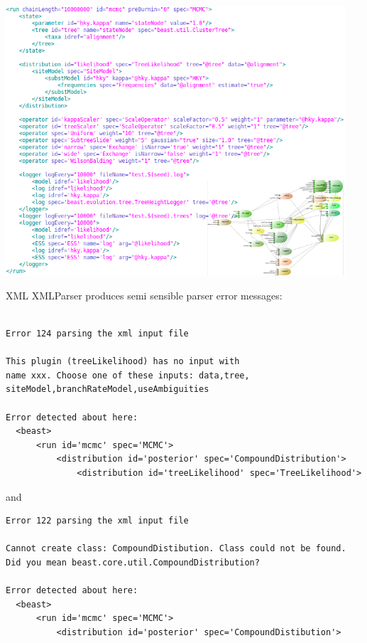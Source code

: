 \documentclass{beamer}
\theoremstyle{definition}
\begin{document}
\begin{frame}
\includegraphics[width=0.95\textwidth]{xml4.png}
\end{frame}


\begin{frame}[containsverbatim]{XML}
XMLParser produces semi sensible parser error messages:

{\tiny
\begin{verbatim}

Error 124 parsing the xml input file

This plugin (treeLikelihood) has no input with 
name xxx. Choose one of these inputs: data,tree,
siteModel,branchRateModel,useAmbiguities

Error detected about here:
  <beast>
      <run id='mcmc' spec='MCMC'>
          <distribution id='posterior' spec='CompoundDistribution'>
              <distribution id='treeLikelihood' spec='TreeLikelihood'>
\end{verbatim}
}

and

{\tiny
\begin{verbatim}
Error 122 parsing the xml input file

Cannot create class: CompoundDistibution. Class could not be found. 
Did you mean beast.core.util.CompoundDistribution?

Error detected about here:
  <beast>
      <run id='mcmc' spec='MCMC'>
          <distribution id='posterior' spec='CompoundDistibution'>

\end{verbatim}
}
\end{frame}
\end{document}
